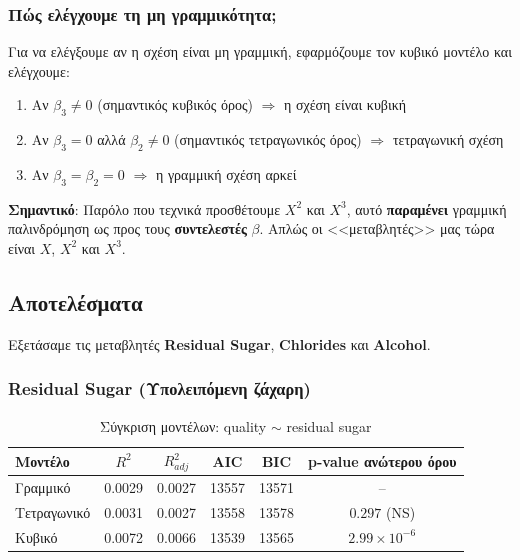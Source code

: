 \documentclass[12pt,a4paper]{article}
\begin{document}
\subsubsection{Πώς ελέγχουμε τη μη γραμμικότητα;}

\begin{theorybox}
Για να ελέγξουμε αν η σχέση είναι μη γραμμική, εφαρμόζουμε τον κυβικό μοντέλο και ελέγχουμε:
\begin{enumerate}
    \item Αν $\beta_3 \neq 0$ (σημαντικός κυβικός όρος) $\Rightarrow$ η σχέση είναι κυβική
    \item Αν $\beta_3 = 0$ αλλά $\beta_2 \neq 0$ (σημαντικός τετραγωνικός όρος) $\Rightarrow$ τετραγωνική σχέση
    \item Αν $\beta_3 = \beta_2 = 0$ $\Rightarrow$ η γραμμική σχέση αρκεί
\end{enumerate}

\textbf{Σημαντικό}: Παρόλο που τεχνικά προσθέτουμε $X^2$ και $X^3$, αυτό \textbf{παραμένει} γραμμική παλινδρόμηση ως προς τους \textbf{συντελεστές} $\beta$. Απλώς οι <<μεταβλητές>> μας τώρα είναι $X$, $X^2$ και $X^3$.
\end{theorybox}

\subsection{Αποτελέσματα}

Εξετάσαμε τις μεταβλητές \textbf{Residual Sugar}, \textbf{Chlorides} και \textbf{Alcohol}.

\subsubsection{Residual Sugar (Υπολειπόμενη ζάχαρη)}

\begin{table}[H]
\centering
\caption{Σύγκριση μοντέλων: quality $\sim$ residual sugar}
\begin{tabular}{lccccc}
\toprule
\textbf{Μοντέλο} & $R^2$ & $R^2_{adj}$ & \textbf{AIC} & \textbf{BIC} & \textbf{p-value ανώτερου όρου} \\
\midrule
Γραμμικό & 0.0029 & 0.0027 & 13557 & 13571 & -- \\
Τετραγωνικό & 0.0031 & 0.0027 & 13558 & 13578 & $0.297$ (NS) \\
Κυβικό & 0.0072 & 0.0066 & 13539 & 13565 & $2.99 \times 10^{-6}$ \\
\bottomrule
\end{tabular}
\end{table}
\end{document}
